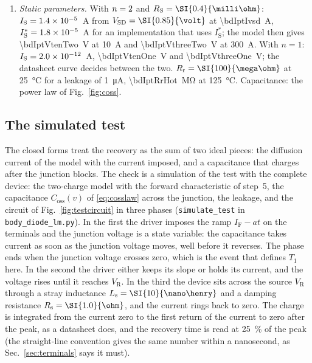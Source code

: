 \documentclass[10pt,a4paper]{scrartcl}
\newcommand{\IF}{I_\mathrm{F}}
\newcommand{\VR}{V_\mathrm{R}}
\newcommand{\Coss}{C_\mathrm{oss}}
\newcommand{\Tone}{T_1}
\newcommand{\IS}{I_\mathrm{S}}
\newcommand{\RS}{R_\mathrm{S}}
\newcommand{\Rr}{R_\mathrm{r}}
\newcommand{\VSD}{V_\mathrm{SD}}
\newcommand{\Ls}{L_\mathrm{s}}
\newcommand{\Rser}{R_\mathrm{s}}
\begin{document}
\begin{enumerate}
\item \emph{Static parameters.} With $n = 2$ and $\RS = \SI{\bdIptRs}{\milli\ohm}$: $\IS = \bdIptIsTwo$~A from $\VSD = \SI{\bdIptVsd}{\volt}$ at \SI{\bdIptIvsd}{\ampere}, $\IS^{*} = \bdIptIsStarTwo$~A for an implementation that uses $\IS^{*}$; the model then gives \SI{\bdIptVtenTwo}{\volt} at \SI{10}{\ampere} and \SI{\bdIptVthreeTwo}{\volt} at \SI{300}{\ampere}. With $n = 1$: $\IS = \bdIptIsOne$~A, \SI{\bdIptVtenOne}{\volt} and \SI{\bdIptVthreeOne}{\volt}; the datasheet curve decides between the two. $\Rr = \SI{\bdIptRr}{\mega\ohm}$ at \SI{25}{\celsius} for a leakage of \SI{1}{\micro\ampere}, \SI{\bdIptRrHot}{\mega\ohm} at \SI{125}{\celsius}. Capacitance: the power law of Fig.~\ref{fig:coss}.
\end{enumerate}

\subsection{The simulated test}
\label{sec:simulated}
The closed forms treat the recovery as the sum of two ideal pieces: the diffusion current of the model with the current imposed, and a capacitance that charges after the junction blocks. The check is a simulation of the test with the complete device: the two-charge model with the forward characteristic of step~5, the capacitance $\Coss(v)$ of \eqref{eq:cosslaw} across the junction, the leakage, and the circuit of Fig.~\ref{fig:testcircuit} in three phases (\texttt{simulate\_test} in \texttt{body\_diode\_lm.py}). In the first the driver imposes the ramp $\IF - at$ on the terminals and the junction voltage is a state variable: the capacitance takes current as soon as the junction voltage moves, well before it reverses. The phase ends when the junction voltage crosses zero, which is the event that defines $\Tone$ here. In the second the driver either keeps its slope or holds its current, and the voltage rises until it reaches $\VR$. In the third the device sits across the source $\VR$ through a stray inductance $\Ls = \SI{\bdIptLs}{\nano\henry}$ and a damping resistance $\Rser = \SI{\bdIptRser}{\ohm}$, and the current rings back to zero. The charge is integrated from the current zero to the first return of the current to zero after the peak, as a datasheet does, and the recovery time is read at \SI{25}{\percent} of the peak (the straight-line convention gives the same number within a nanosecond, as Sec.~\ref{sec:terminals} says it must).
\end{document}
